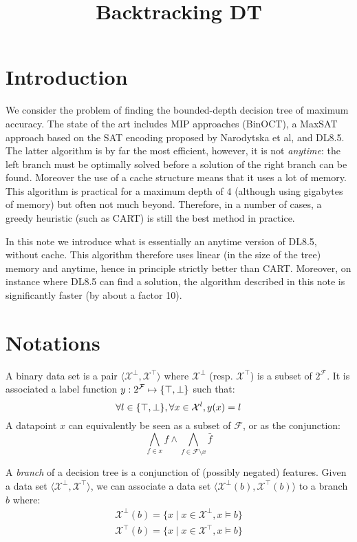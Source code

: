 \documentclass{article}
\title{Backtracking DT}
\newcommand{\setex}[1]{\ensuremath{{\mathcal X}^{#1}}\xspace}
\newcommand{\posex}{{\setex{\top}}\xspace}
\newcommand{\negex}{{\setex{\bot}}\xspace}
\newcommand{\features}{\ensuremath{{\mathcal F}}\xspace}
\newcommand{\var}{\ensuremath{x}}
\newcommand{\ex}{\ensuremath{\var}}
\newcommand{\afeat}[0]{\ensuremath{f}}
\newcommand{\aclass}[0]{\ensuremath{l}}
\newcommand{\classlabel}[1][]{\ensuremath{\ifthenelse{\equal{#1}{}}{{y}}{{y({{#1}})}}}}
\newcommand{\abranch}[0]{\ensuremath{b}}
\begin{document}
\maketitle

\section*{Introduction}

We consider the problem of finding the bounded-depth decision tree of maximum accuracy.
The state of the art includes MIP approaches (BinOCT), a MaxSAT approach based on the SAT encoding proposed by Narodytska et al, and DL8.5.
The latter algorithm is by far the most efficient, however, it is not \emph{anytime}: the left branch must be optimally solved before a solution of the right branch can be found. Moreover the use of a cache structure means that it uses a lot of memory. This algorithm is practical for a maximum depth of 4 (although using gigabytes of memory) but often not much beyond. Therefore, in a number of cases, a greedy heuristic (such as CART) is still the best method in practice.

\medskip

In this note we introduce what is essentially an anytime version of DL8.5, without cache.
This algorithm therefore uses linear (in the size of the tree) memory and anytime, hence in principle strictly better than CART. Moreover, on instance where DL8.5 can find a solution, the algorithm described in this note is significantly faster (by about a factor 10).

\section*{Notations}

A binary data set is a pair $\langle \negex,\posex \rangle$ where $\negex$ (resp. $\posex$) is a subset of $2^{\features}$. It is associated a label function $\classlabel : 2^{\features} \mapsto \{\top,\bot\}$ such that:
$$
\forall \aclass \in \{\top,\bot\}, \forall \ex \in \setex{\aclass}, \classlabel[\ex] = \aclass
$$
A datapoint $\ex$ can equivalently be seen as a subset of $\features$, or as the conjunction:
$$
\bigwedge_{\afeat \in \ex}\afeat \wedge \bigwedge_{\afeat \in \features \setminus \ex}\bar{\afeat}
$$

A \emph{branch} of a decision tree is a conjunction of (possibly negated) features. 
Given a data set $\langle \negex,\posex \rangle$, we can associate a data set $\langle \negex(\abranch),\posex(\abranch) \rangle$ to a branch $\abranch$ where:
\begin{eqnarray*}
\negex(\abranch) = \{\ex \mid \ex \in \negex, \ex \models \abranch\}\\
\posex(\abranch) = \{\ex \mid \ex \in \posex, \ex \models \abranch\}
\end{eqnarray*}
\end{document}
